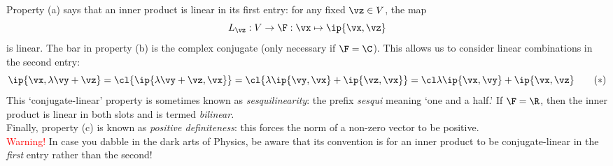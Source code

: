 Property (a) says that an inner product is linear in its first entry: for any fixed $\vz\in V$, the map
\[L_\vz:V\to\F:\vx\mapsto\ip{\vx,\vz}\]
is linear. The bar in property (b) is the complex conjugate (only necessary if $\F=\C$). This allows us to consider linear combinations in the second entry:
\[\ip{\vx,\lambda\vy+\vz}=\cl{\ip{\lambda\vy+\vz,\vx}}=\cl{\lambda\ip{\vy,\vx}+\ip{\vz,\vx}} =\cl\lambda\ip{\vx,\vy}+\ip{\vx,\vz} \tag{$\ast$}\]
This `conjugate-linear' property is sometimes known as \emph{sesquilinearity}: the prefix \emph{sesqui} meaning `one and a half.' If $\F=\R$, then the inner product is linear in both slots and is termed \emph{bilinear.}\\
Finally, property (c) is known as \emph{positive definiteness}: this forces the norm of a non-zero vector to be positive.\\

\textcolor{red}{Warning!} In case you dabble in the dark arts of Physics, be aware that its convention is for an inner product to be conjugate-linear in the \emph{first} entry rather than the second!


